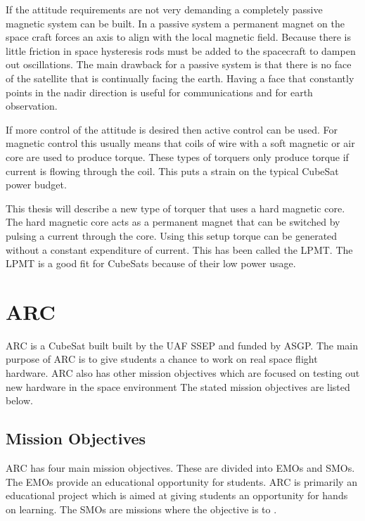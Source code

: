 If the attitude requirements are not very demanding a completely passive magnetic system can be built. In a passive system a permanent magnet on the space craft forces an axis to align with the local magnetic field. Because there is little friction in space hysteresis rods must be added to the spacecraft to dampen out oscillations. The main drawback for a passive system is that there is no face of the satellite that is continually facing the earth. Having a face that constantly points in the nadir direction is useful for communications and for earth observation.

If more control of the attitude is desired then active control can be used. For magnetic control this usually means that coils of wire with a soft magnetic or air core are used to produce torque. These types of torquers only produce torque if current is flowing through the coil. This puts a strain on the typical CubeSat power budget.

This thesis will describe a new type of torquer that uses a hard magnetic core. The hard magnetic core acts as a permanent magnet that can be switched by pulsing a current through the core. Using this setup torque can be generated without a constant expenditure of current. This has been called the \acf{LPMT}. The \ac{LPMT} is a good fit for CubeSats because of their low power usage.

\section{\acl{ARC}}

\ac{ARC} is a CubeSat built built by the \ac{UAF} \ac{SSEP} and funded by \ac{ASGP}. The main purpose of \ac{ARC} is to give students a chance to work on real space flight hardware. \ac{ARC} also has other mission objectives which are focused on testing out new hardware in the space environment The stated mission objectives are listed below.


\subsection{Mission Objectives}


\ac{ARC} has four main mission objectives. These are divided into \acp{EMO} and \acp{SMO}. The \acp{EMO} provide an educational opportunity for students. \ac{ARC} is primarily an educational project which is aimed at giving students an opportunity for hands on learning. The \acp{SMO} are missions where the objective is to  \cite{ArcCdr}.


